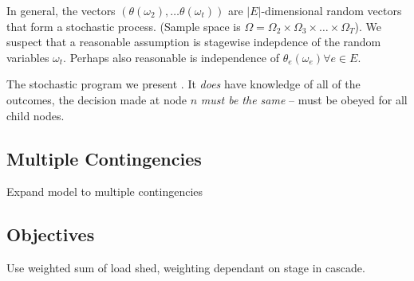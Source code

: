 In general, the vectors $(\theta(\omega_2), \ldots \theta(\omega_t))$
are $|E|$-dimensional random vectors that form a stochastic process.
(Sample space is $\Omega = \Omega_2 \times \Omega_3 \times \ldots
\times \Omega_T$).  We suspect that a reasonable assumption is
stagewise indepdence of the random variables $\omega_t$.  Perhaps also
reasonable is independence of $\theta_e(\omega_e) \forall e \in E$.

The stochastic program we present .  It {\em does} have knowledge of
all of the outcomes, the decision made at node $n$ {\em must be the
  same} -- must be obeyed for all child nodes.

\subsection{Multiple Contingencies}
Expand model to multiple contingencies

\subsection{Objectives}
Use weighted sum of load shed, weighting dependant on stage in cascade.
